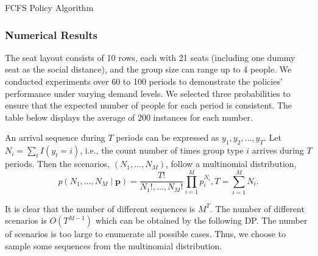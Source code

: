 \begin{algorithm}[H]
  \caption{FCFS Policy Algorithm}\label{algo_fcfs}
\end{algorithm}

\subsubsection*{Numerical Results}
The seat layout consists of 10 rows, each with 21 seats (including one dummy seat as the social distance), and the group size can range up to 4 people. We conducted experiments over 60 to 100 periods to demonstrate the policies' performance under varying demand levels. We selected three probabilities to ensure that the expected number of people for each period is consistent. The table below displays the average of 200 instances for each number.

An arrival sequence during $T$ periods can be expressed as ${y_1, y_2, \ldots, y_T}$. Let $N_i = \sum_{t} I(y_t = i)$, i.e., the count number of times group type $i$ arrives during $T$ periods. Then the scenarios, $(N_1, \ldots, N_M)$, follow a multinomial distribution, 
$$
p\left(N_1, \ldots, N_M \mid \mathbf{p}\right)=\frac{T !}{N_{1} !, \ldots, N_{M} !} \prod_{i=1}^M p_i^{N_i}, T=\sum_{i=1}^M N_i.
$$

It is clear that the number of different sequences is $M^T$. The number of different scenarios is
$O(T^{M-1})$ which can be obtained by the following DP. The number of scenarios is too large to enumerate all possible cases. Thus, we choose to sample some sequences from the multinomial distribution.


